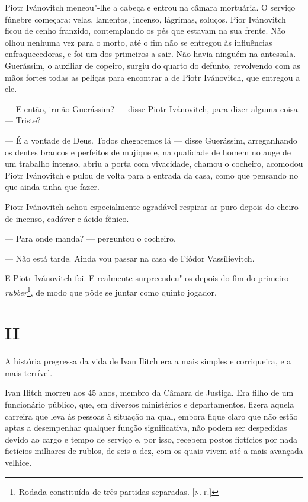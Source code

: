 Piotr Ivánovitch meneou"-lhe a cabeça e entrou na câmara mortuária. O
serviço fúnebre começara: velas, lamentos, incenso, lágrimas, soluços.
Pior Ivánovitch ficou de cenho franzido, contemplando os pés que estavam
na sua frente. Não olhou nenhuma vez para o morto, até o fim não se
entregou às influências enfraquecedoras, e foi um dos primeiros a sair.
Não havia ninguém na antessala. Guerássim, o auxiliar de copeiro, surgiu
do quarto do defunto, revolvendo com as mãos fortes todas as peliças
para encontrar a de Piotr Ivánovitch, que entregou a ele.

--- E então, irmão Guerássim? --- disse Piotr Ivánovitch, para dizer alguma
coisa. --- Triste?

--- É a vontade de Deus. Todos chegaremos lá --- disse Guerássim,
arreganhando os dentes brancos e perfeitos de mujique e, na qualidade de
homem no auge de um trabalho intenso, abriu a porta com vivacidade,
chamou o cocheiro, acomodou Piotr Ivánovitch e pulou de volta para a
entrada da casa, como que pensando no que ainda tinha que fazer.

Piotr Ivánovitch achou especialmente agradável respirar ar puro depois
do cheiro de incenso, cadáver e ácido fênico.

--- Para onde manda? --- perguntou o cocheiro.

--- Não está tarde. Ainda vou passar na casa de Fiódor Vassílievitch.

E Piotr Ivánovitch foi. E realmente surpreendeu"-os depois do fim do
primeiro \emph{rubber}\footnote{Rodada constituída de três partidas
  separadas. {[}\textsc{n.\,t.}{]}}, de modo que pôde se juntar como quinto
jogador.

\section*{II}

A história pregressa da vida de Ivan Ilitch era a mais simples e
corriqueira, e a mais terrível.

Ivan Ilitch morreu aos 45 anos, membro da Câmara de Justiça. Era filho
de um funcionário público, que, em diversos ministérios e departamentos,
fizera aquela carreira que leva às pessoas à situação na qual, embora
fique claro que não estão aptas a desempenhar qualquer função
significativa, não podem ser despedidas devido ao cargo e tempo de
serviço e, por isso, recebem postos fictícios por nada fictícios
milhares de rublos, de seis a dez, com os quais vivem até a mais
avançada velhice.

